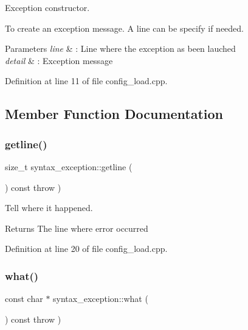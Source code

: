 Exception constructor. 

To create an exception message. A line can be specify if needed.


\begin{DoxyParams}{Parameters}
{\em line} & \+: Line where the exception as been lauched \\
\hline
{\em detail} & \+: Exception message \\
\hline
\end{DoxyParams}


Definition at line 11 of file config\+\_\+load.\+cpp.



\subsection{Member Function Documentation}
\hypertarget{classsyntax__exception_aa25100b3e6601bb67aa5a5d1e76f508e}{}\label{classsyntax__exception_aa25100b3e6601bb67aa5a5d1e76f508e} 
\subsubsection{\texorpdfstring{getline()}{getline()}}
{\footnotesize\ttfamily size\+\_\+t syntax\+\_\+exception\+::getline (\begin{DoxyParamCaption}{ }\end{DoxyParamCaption}) const throw  ) }



Tell where it happened. 

\begin{DoxyReturn}{Returns}
The line where error occurred 
\end{DoxyReturn}


Definition at line 20 of file config\+\_\+load.\+cpp.

\hypertarget{classsyntax__exception_a2a32f5e0c2acbbf37c10c9aa3d72506c}{}\label{classsyntax__exception_a2a32f5e0c2acbbf37c10c9aa3d72506c} 
\subsubsection{\texorpdfstring{what()}{what()}}
{\footnotesize\ttfamily const char $\ast$ syntax\+\_\+exception\+::what (\begin{DoxyParamCaption}{ }\end{DoxyParamCaption}) const throw  ) }



